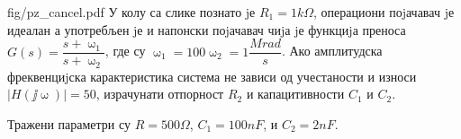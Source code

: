 \begin{slikaDesno}{fig/pz_cancel.pdf}
    \PID \label{z:pz_cancel}
    У колу са слике познато jе $R_1 = 1\unit{k \Omega}$, операциони поjачавач jе идеалан а употребљен jе и напонски 
    поjачавач чиjа jе функциjа преноса $G(s) = \dfrac{s + \upomega_1}{s + \upomega_2}$, где су
    $\upomega_1 = 100 \upomega_2 = 1\unit{\dfrac{Mrad}{s}}$. 
    Ако амплитудска фреквенциjска карактеристика система не зависи од учестаности и износи $|H(\jj\upomega)| = 50$, израчунати отпорност $R_2$
    и капацитивности $C_1$ и $C_2$.
\end{slikaDesno}

\REZULTAT

Тражени параметри су $R = 500 \unit{\Omega}$, $C_1 = 100\unit{nF}$, и $C_2 = 2\unit{nF}$.